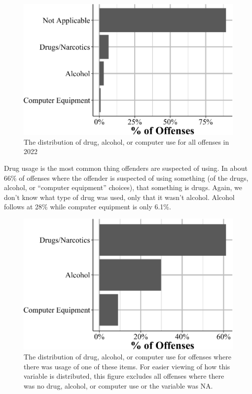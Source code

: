 \documentclass[
  12pt,
  openany]{book}
\begin{document}
\begin{figure}

{\centering \includegraphics[width=0.9\linewidth]{13_nibrs_offense_files/figure-latex/offenseDrugAlcoholComputer-1} 

}

\caption{The distribution of drug, alcohol, or computer use for all offenses in 2022}\label{fig:offenseDrugAlcoholComputer}
\end{figure}

Drug usage is the most common thing offenders are suspected of using. In about 66\% of offenses where the offender is suspected of using something (of the drugs, alcohol, or ``computer equipment'' choices), that something is drugs. Again, we don't know what type of drug was used, only that it wasn't alcohol. Alcohol follows at 28\% while computer equipment is only 6.1\%.

\begin{figure}

{\centering \includegraphics[width=0.9\linewidth]{13_nibrs_offense_files/figure-latex/offenseDrugAlcoholComputerAny-1} 

}

\caption{The distribution of drug, alcohol, or computer use for offenses where there was usage of one of these items. For easier viewing of how this variable is distributed, this figure excludes all offenses where there was no drug, alcohol, or computer use or the variable was NA.}\label{fig:offenseDrugAlcoholComputerAny}
\end{figure}
\end{document}
